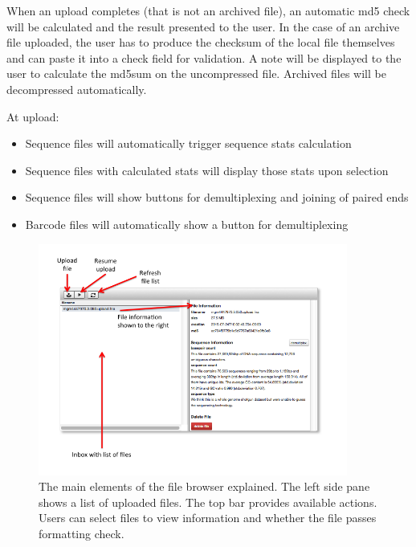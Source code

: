 \documentclass[12pt,fullpage]{report}
\begin{document}
When an upload completes (that is not an archived file), an automatic md5 check will be calculated and the result presented to the user. In the case of an archive file uploaded, the user has to produce the checksum of the local file themselves and can paste it into a check field for validation. A note will be displayed to the user to calculate the md5sum on the uncompressed file. Archived files will be decompressed automatically.

At upload:
\begin{itemize}
\item Sequence files will automatically trigger sequence stats calculation
\item Sequence files with calculated stats will display those stats upon selection
\item Sequence files will show buttons for demultiplexing and joining of paired ends
\item Barcode files will automatically show a button for demultiplexing
\end{itemize}

\begin{figure}
\begin{center}
\includegraphics[width=4in]{Images/upload_inbox.png}
\end{center}
\label{fig:upload_inbox}
\caption{The main elements of the file browser explained. The left side pane shows a list of uploaded files. The top bar provides available actions. Users can select files to view information and whether the file passes formatting check.}
\end{figure}
\end{document}
